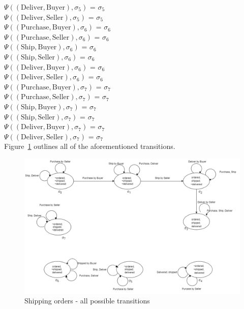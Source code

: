 \documentclass[a4paper]{article}
\begin{document}
$\Psi((\text{Deliver},\text{Buyer}),\sigma_5)$ = $\sigma_5$ \\[0.1\baselineskip] 
$\Psi((\text{Deliver},\text{Seller}),\sigma_5)$ = $\sigma_5$ \\[0.7\baselineskip] 
$\Psi((\text{Purchase},\text{Buyer}),\sigma_6)$ = $\sigma_6$ \\[0.1\baselineskip] 
$\Psi((\text{Purchase},\text{Seller}),\sigma_6)$ = $\sigma_6$ \\[0.1\baselineskip] 
$\Psi((\text{Ship},\text{Buyer}),\sigma_6)$ = $\sigma_6$ \\[0.1\baselineskip] 
$\Psi((\text{Ship},\text{Seller}),\sigma_6)$ = $\sigma_6$ \\[0.1\baselineskip] 
$\Psi((\text{Deliver},\text{Buyer}),\sigma_6)$ = $\sigma_6$ \\[0.1\baselineskip] 
$\Psi((\text{Deliver},\text{Seller}),\sigma_6)$ = $\sigma_6$ \\[0.7\baselineskip] 
$\Psi((\text{Purchase},\text{Buyer}),\sigma_7)$ = $\sigma_7$ \\[0.1\baselineskip] 
$\Psi((\text{Purchase},\text{Seller}),\sigma_7)$ = $\sigma_7$ \\[0.1\baselineskip] 
$\Psi((\text{Ship},\text{Buyer}),\sigma_7)$ = $\sigma_7$ \\[0.1\baselineskip] 
$\Psi((\text{Ship},\text{Seller}),\sigma_7)$ = $\sigma_7$ \\[0.1\baselineskip] 
$\Psi((\text{Deliver},\text{Buyer}),\sigma_7)$ = $\sigma_7$ \\[0.1\baselineskip] 
$\Psi((\text{Deliver},\text{Seller}),\sigma_7)$ = $\sigma_7$ \\[0.7\baselineskip] 
Figure~\ref{fig:shipping_transitions} outlines all of the aforementioned transitions.
\begin{figure}[H]
    \centering
    \includegraphics[width=1\linewidth]{onlinestore.png}
    \caption{Shipping orders - all possible transitions}
    \label{fig:shipping_transitions}
\end{figure}
\end{document}
